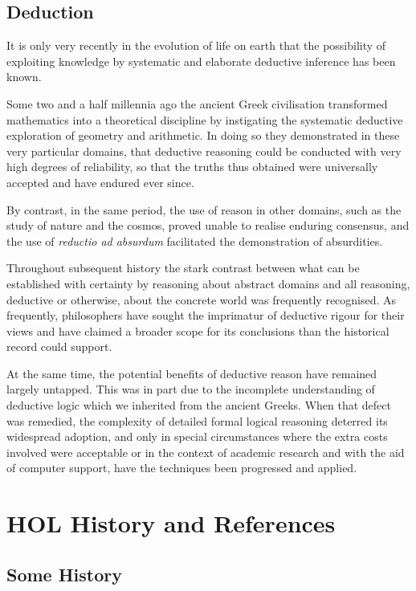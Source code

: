 \documentclass[10pt,titlepage]{book}
\begin{document}
\subsection{Deduction}

It is only very recently in the evolution of life on earth that the possibility of exploiting knowledge by systematic and elaborate deductive inference has been known.

Some two and a half millennia ago the ancient Greek civilisation transformed mathematics into a theoretical discipline by instigating the systematic deductive exploration of geometry and arithmetic.
In doing so they demonstrated in these very particular domains, that deductive reasoning could be conducted with very high degrees of reliability, so that the truths thus obtained were universally accepted and have endured ever since.

By contrast, in the same period, the use of reason in other domains, such as the study of nature and the cosmos, proved unable to realise enduring consensus, and the use of \emph{reductio ad absurdum} facilitated the demonstration of absurdities.

Throughout subsequent history the stark contrast between what can be established with certainty by reasoning about abstract domains and all reasoning, deductive or otherwise, about the concrete world was frequently recognised.
As frequently, philosophers have sought the imprimatur of deductive rigour for their views and have claimed a broader scope for its conclusions than the historical record could support.

At the same time, the potential benefits of deductive reason have remained largely untapped.
This was in part due to the incomplete understanding of deductive logic which we inherited from the ancient Greeks.
When that defect was remedied, the complexity of detailed formal logical reasoning deterred its widespread adoption, and only in special circumstances where the extra costs involved were acceptable or in the context of academic research and with the aid of computer support, have the techniques been progressed and applied.


\section{HOL History and References}

\subsection{Some History}
\end{document}
